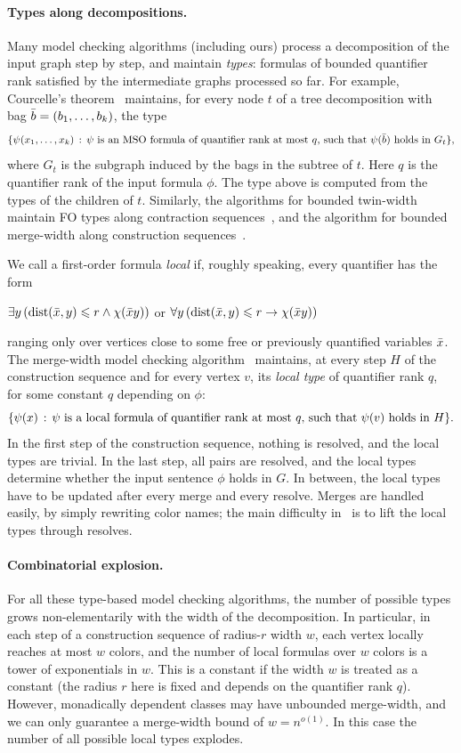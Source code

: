 \paragraph{Types along decompositions.}
Many model checking algorithms (including ours) process a decomposition of the input graph step by step, and maintain \emph{types}: formulas of bounded quantifier rank satisfied by the intermediate graphs processed so far.
For example, Courcelle's theorem~\cite{courcelle1990monadic} maintains, for every node $t$ of a tree decomposition with bag $\bar b=(b_1,\ldots,b_k)$, the type
\[
\{\psi(x_1,\ldots,x_k) \,:\, \text{$\psi$ is an MSO formula of quantifier rank at most $q$, such that $\psi(\bar b)$ holds in $G_t$} \},
\]
where $G_t$ is the subgraph induced by the bags in the subtree of $t$. Here $q$ is the quantifier rank of the input formula $\phi$.
The type above is computed from the types of the children of $t$.
Similarly, the algorithms for bounded twin-width maintain FO types along contraction sequences~\cite{tww1,tww-types-icalp}, and the algorithm for bounded merge-width along construction sequences~\cite{mw-arxiv}.

We call a first-order formula \emph{local} if, roughly speaking, every quantifier has the form 
\begin{center}
  $\exists y\,(\mathrm{dist}(\bar x,y)\leqslant r\land\chi(\bar x y))$ \quad or \quad $\forall y\,(\mathrm{dist}(\bar x,y)\leqslant r\to\chi(\bar x y))$  
\end{center}
ranging only over vertices close to some free or previously quantified variables $\bar x$.
The merge-width model checking algorithm~\cite{mw-arxiv} maintains, at every step $H$ of the construction sequence and for every vertex $v$, its \emph{local type} of quantifier rank $q$, for some constant $q$ depending on $\phi$:
\[
\{\psi(x) \,:\, \text{$\psi$ is a local formula of quantifier rank at most $q$, such that $\psi(v)$ holds in $H$} \}.
\]
In the first step of the construction sequence, nothing is resolved, and the local types are trivial.
In the last step, all pairs are resolved, and the local types determine whether the input sentence $\phi$ holds in $G$.
In between, the local types have to be updated after every merge and every resolve.
Merges are handled easily, by simply rewriting color names; the main difficulty in~\cite{mw-arxiv} is to lift the local types through resolves.

\paragraph{Combinatorial explosion.}
For all these type-based model checking algorithms, the number of possible types grows non-elementarily with the width of the decomposition.
In particular, in each step of a construction sequence of radius-$r$ width $w$, each vertex locally reaches at most $w$ colors, and the number of local formulas over $w$ colors is a tower of exponentials in $w$.
This is a constant if the width \(w\) is treated as a constant (the radius $r$ here is fixed and depends on the quantifier rank $q$).
However, monadically dependent classes may have unbounded merge-width, and we can only guarantee a merge-width bound of \(w = n^{o(1)}\). 
In this case the number of all possible local types explodes.


